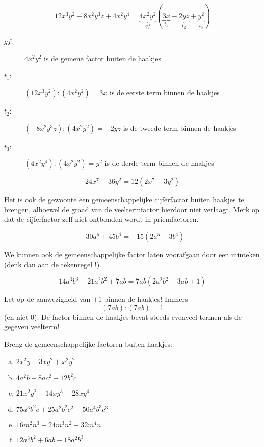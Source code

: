 \documentclass[12pt]{article}
\begin{document}
\begin{voorbeeld}
$$12x^3y^2 - 8x^2y^3z + 4x^2y^4 = \underbrace{4x^2y^2}_{gf} (\underbrace{3x}_{t_1} - \underbrace{2yz}_{t_2} + \underbrace{y^2}_{t_3})$$
\begin{description}
  \item[$gf$:] $4x^2y^2$ is de gemene factor buiten de haakjes
  \item[$t_1$:] $(12x^3y^2):(4x^2y^2)=3x$ is de eerste term binnen de haakjes
  \item[$t_2$:] $(-8x^2y^3z):(4x^2y^2)=-2yz$ is de tweede term binnen de haakjes
  \item[$t_3$:] $(4x^2y^4):(4x^2y^2)=y^2$ is de derde term binnen de haakjes
\end{description}
\end{voorbeeld}

\begin{voorbeeld}
$$24x^7 - 36y^2 = 12 (2x^7 - 3y^2)$$

Het is ook de gewoonte een gemeenschappelijke cijferfactor buiten haakjes te brengen, alhoewel de graad van de veeltermfactor hierdoor niet verlaagt. Merk op dat de cijferfactor zelf niet ontbonden wordt in priemfactoren.
\end{voorbeeld}

\begin{voorbeeld}
$$ -30a^5 + 45b^4 = -15 (2a^5 - 3b^4)$$

We kunnen ook de gemeenschappelijke factor laten voorafgaan door een minteken (denk dan aan de tekenregel !).
\end{voorbeeld}

\begin{voorbeeld}
$$14a^3b^3 - 21a^2b^2 + 7ab = 7ab (2a^2b^2 - 3ab + 1)$$

Let op de aanwezigheid van $+1$ binnen de haakjes! Immers 
$$(7ab):(7ab) = 1$$
(en niet $0$). De factor binnen de haakjes bevat steeds evenveel termen als de gegeven veelterm!
\end{voorbeeld}

\begin{exercise}
Breng de gemeenschappelijke factoren buiten haakjes:
\begin{enumerate}[(a)]
  \item $2x^2y - 3xy^2 + x^2y^2$
  \item $4a^2b + 8ac^2 - 12b^2c$
  \item $21x^2y^2 - 14xy^3 - 28xy^4$
  \item $75a^3b^2c + 25a^2b^2c^2 - 50a^4b^3c^3$
  \item $16m^2n^3 - 24m^3n^2 + 32m^4n$
  \item $12a^3b^2 + 6ab - 18a^2b^3$
\end{enumerate}
\end{exercise}
\end{document}
